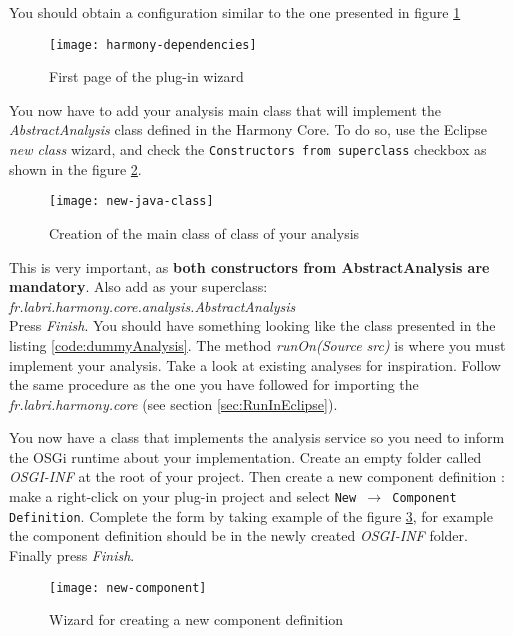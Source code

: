 You should obtain a configuration similar to the one presented in figure \ref{fig:harmony-dependencies}

	\begin{figure}[H]
		\centering
		\texttt{[image: harmony-dependencies]}
		\caption{First page of the plug-in wizard}
		\label{fig:harmony-dependencies}
	\end{figure}

You now have to add your analysis main class that will implement the \emph{AbstractAnalysis} class defined in the Harmony Core. To do so, use the Eclipse \emph{new class} wizard, and check the \texttt{Constructors from superclass} checkbox as shown in the figure \ref{fig:new-java-class}. 

	\begin{figure}[H]
		\centering
		\texttt{[image: new-java-class]}
		\caption{Creation of the main class of class of your analysis}
		\label{fig:new-java-class}
	\end{figure}

This is very important, as \textbf{both constructors from AbstractAnalysis are mandatory}. Also add as your superclass: \\ \emph{fr.labri.harmony.core.analysis.AbstractAnalysis}\\
Press \emph{Finish}. You should have something looking like the class presented in the listing \ref{code:dummyAnalysis}. The method \emph{runOn(Source src)} is where you must implement your analysis. Take a look at existing analyses for inspiration. Follow the same procedure as the one you have followed for importing the \emph{fr.labri.harmony.core} (see section \ref{sec:RunInEclipse}).


You now have a class that implements the analysis service so you need to inform the OSGi runtime about your implementation. Create an empty folder called \emph{OSGI-INF} at the root of your project. Then create a new component definition : make a right-click on your plug-in project and select \texttt{New $\rightarrow$ Component Definition}. Complete the form by taking example of the figure \ref{fig:new-component}, for example the component definition should be in the newly created  \emph{OSGI-INF} folder. Finally press \emph{Finish}.

	\begin{figure}[H]
		\centering
		\texttt{[image: new-component]}
		\caption{Wizard for creating a new component definition}
		\label{fig:new-component}
	\end{figure}
	
